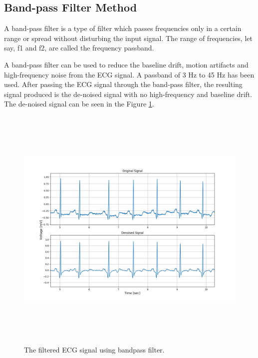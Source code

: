 \subsection{Band-pass Filter Method}
A band-pass filter is a type of filter which passes frequencies only in a certain range or spread without disturbing the input signal. The range of frequencies, let say, f1 and f2, are called the frequency passband.

A band-pass filter can be used to reduce the baseline drift, motion artifacts and high-frequency noise from the ECG signal. A passband of 3 Hz to 45 Hz has been used. After passing the ECG signal through the band-pass filter, the resulting signal produced is the de-noised signal with no high-frequency and baseline drift. The de-noised signal can be seen in the Figure \ref{fig:bandpass_denoised}. 

\begin{figure}[h]
	\centering
	\includegraphics[width=15cm,height=12cm,keepaspectratio=true]{images/bandpass_denoised_1}
	\caption{
		The filtered ECG signal using bandpass filter.
	}
	\label{fig:bandpass_denoised}
\end{figure}


